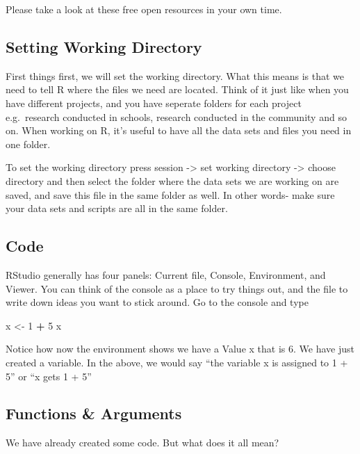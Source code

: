 \documentclass[]{book}
\newenvironment{Shaded}{\begin{snugshade}}{\end{snugshade}}
\newcommand{\DecValTok}[1]{\textcolor[rgb]{0.00,0.00,0.81}{#1}}
\newcommand{\StringTok}[1]{\textcolor[rgb]{0.31,0.60,0.02}{#1}}
\newcommand{\OperatorTok}[1]{\textcolor[rgb]{0.81,0.36,0.00}{\textbf{#1}}}
\newcommand{\NormalTok}[1]{#1}
\begin{document}
Please take a look at these free open resources in your own time.

\subsection{Setting Working Directory}\label{setting-working-directory}

First things first, we will set the working directory. What this means
is that we need to tell R where the files we need are located. Think of
it just like when you have different projects, and you have seperate
folders for each project e.g.~research conducted in schools, research
conducted in the community and so on. When working on R, it's useful to
have all the data sets and files you need in one folder.

To set the working directory press session -\textgreater{} set working
directory -\textgreater{} choose directory and then select the folder
where the data sets we are working on are saved, and save this file in
the same folder as well. In other words- make sure your data sets and
scripts are all in the same folder.

\subsection{Code}\label{code}

RStudio generally has four panels: Current file, Console, Environment,
and Viewer. You can think of the console as a place to try things out,
and the file to write down ideas you want to stick around. Go to the
console and type

\begin{Shaded}
\begin{Highlighting}[]
\NormalTok{x <-}\StringTok{ }\DecValTok{1} \OperatorTok{+}\StringTok{ }\DecValTok{5}
\NormalTok{x}
\end{Highlighting}
\end{Shaded}

Notice how now the environment shows we have a Value x that is 6. We
have just created a variable. In the above, we would say ``the variable
x is assigned to 1 + 5'' or ``x gets 1 + 5''

\subsection{Functions \& Arguments}\label{functions-arguments}

We have already created some code. But what does it all mean?
\end{document}

